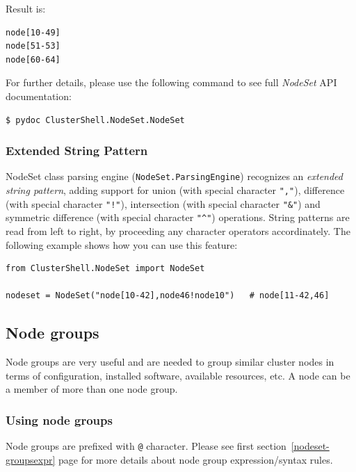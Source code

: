 \documentclass[english,a4paper]{csuserguide}
\newcommand{\NodeSet}{\textit{NodeSet}\xspace}
\begin{document}
Result is:
\medskip
\begin{lstlisting}[breaklines=true, breakatwhitespace=true]
node[10-49]
node[51-53]
node[60-64]
\end{lstlisting}

\bigskip

For further details, please use the following command to see full \NodeSet API documentation:
\begin{verbatim}
$ pydoc ClusterShell.NodeSet.NodeSet
\end{verbatim}

\subsubsection{Extended String Pattern}
\label{class-NodeSet-extended-patterns}

NodeSet class parsing engine (\lstinline+NodeSet.ParsingEngine+) recognizes an \textit{extended string pattern}, adding support for union (with special character \texttt{","}), difference (with special character \texttt{"!"}), intersection (with special character \texttt{"\&"}) and symmetric difference (with special character \verb+"^"+) operations. String patterns are read from left to right, by proceeding any character operators accordinately. The following example shows how you can use this feature:
\medskip
\begin{lstlisting}[breaklines=true, breakatwhitespace=true]
from ClusterShell.NodeSet import NodeSet

nodeset = NodeSet("node[10-42],node46!node10")   # node[11-42,46]
\end{lstlisting}

\pagebreak[4]

\subsection{Node groups}
\label{class-NodeSet-groups}

Node groups are very useful and are needed to group similar cluster nodes in terms of configuration, installed software, available resources, etc. A node can be a member of more than one node group.

\subsubsection{Using node groups}

Node groups are prefixed with \texttt{@} character. Please see first section~\ref{nodeset-groupsexpr} page \pageref{nodeset-groupsexpr} for more details about node group expression/syntax rules.
\end{document}
